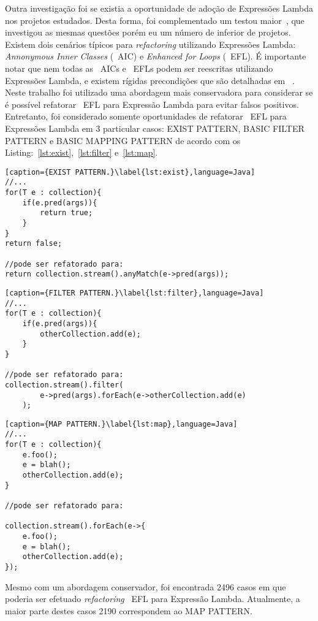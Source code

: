 Outra investigação foi se existia a oportunidade de adoção de Expressões Lambda nos projetos estudados. Desta forma, foi complementado um testou maior~\cite{gyori2013crossing},  que investigou as mesmas questões porém eu um número de  inferior de projetos. Existem dois cenários típicos para \textit{refactoring} utilizando Expressões Lambda: \textit{Annonymous Inner Classes} (~\acs{AIC}) e \textit{Enhanced for Loops} (~\acs{EFL}). É importante notar que nem todas as ~\acs{AIC}s e ~\acs{EFL}s podem ser reescritas utilizando Expressões Lambda, e existem rígidas precondições que são detalhadas em ~\cite{gyori2013crossing}. Neste trabalho foi utilizado uma abordagem mais conservadora para considerar se é possível refatorar ~\acl{EFL} para Expressão Lambda para evitar falsos positivos.  Entretanto, foi considerado somente oportunidades de refatorar ~\acs{EFL} para Expressões Lambda em 3 particular casos: EXIST PATTERN, BASIC FILTER PATTERN e BASIC MAPPING PATTERN de acordo com os Listing:~\ref{lst:exist},~\ref{lst:filter} e~\ref{lst:map}.

\begin{lstlisting}[caption={EXIST PATTERN.}\label{lst:exist},language=Java]
//...
for(T e : collection){
	if(e.pred(args)){
		return true;
	}
}
return false;

//pode ser refatorado para:
return collection.stream().anyMatch(e->pred(args));
\end{lstlisting}

\begin{lstlisting}[caption={FILTER PATTERN.}\label{lst:filter},language=Java] 
//...
for(T e : collection){
	if(e.pred(args)){
		otherCollection.add(e);
	}
}

//pode ser refatorado para:
collection.stream().filter(
		e->pred(args).forEach(e->otherCollection.add(e)
	);
\end{lstlisting}

\begin{lstlisting}[caption={MAP PATTERN.}\label{lst:map},language=Java] 
//...
for(T e : collection){
	e.foo();
	e = blah();
	otherCollection.add(e);
}

//pode ser refatorado para:

collection.stream().forEach(e->{
	e.foo();
	e = blah();
	otherCollection.add(e);
});
\end{lstlisting}

Mesmo com um abordagem conservador, foi encontrada 2496 casos em que poderia ser efetuado \textit{refactoring} ~\acs{EFL} para Expressão Lambda. Atualmente, a maior parte destes casos 2190 correspondem ao MAP PATTERN.


